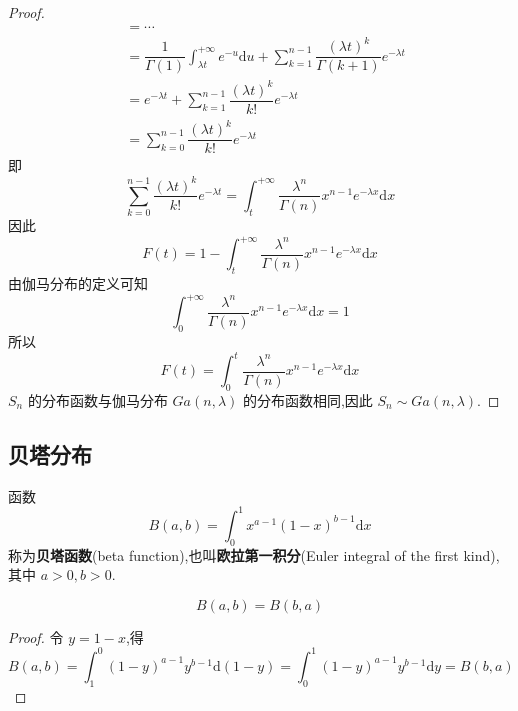 \begin{proof}
$$\begin{aligned}
        &= \cdots \\
        &= \dfrac{1}{\Gamma(1)} \int_{\lambda t}^{+\infty} e^{-u} \text{d}u + \sum_{k=1}^{n-1} \dfrac{(\lambda t)^{k}}{\Gamma(k+1)} e^{-\lambda t} \\
        &= e^{-\lambda t} + \sum_{k=1}^{n-1} \dfrac{(\lambda t)^{k}}{k!} e^{-\lambda t} \\
        &= \sum_{k=0}^{n-1} \dfrac{(\lambda t)^{k}}{k!} e^{-\lambda t}
    \end{aligned}
    $$
    即
    $$
    \sum_{k=0}^{n-1} \dfrac{(\lambda t)^{k}}{k!} e^{-\lambda t} = \int_{t}^{+\infty} \dfrac{\lambda^n}{\Gamma(n)} x^{n-1} e^{-\lambda x} \text{d}x
    $$
    因此
    $$
    F(t) = 1 - \int_{t}^{+\infty} \dfrac{\lambda^n}{\Gamma(n)} x^{n-1} e^{-\lambda x} \text{d}x
    $$
    由伽马分布的定义可知
    $$
    \int_{0}^{+\infty} \dfrac{\lambda^n}{\Gamma(n)} x^{n-1} e^{-\lambda x} \text{d}x = 1
    $$
    所以
    $$
    F(t) = \int_{0}^{t} \dfrac{\lambda^n}{\Gamma(n)} x^{n-1} e^{-\lambda x} \text{d}x
    $$
    $S_n$ 的分布函数与伽马分布 $Ga(n,\lambda)$ 的分布函数相同,因此 $S_n \sim Ga(n,\lambda)$.
\end{proof}

\subsection{贝塔分布}

\begin{definition}
    \indent 函数
    \begin{equation}
        B(a,b) = \int_{0}^{1} x^{a-1} (1-x)^{b-1} \mathrm{d}x
    \end{equation}
    称为\textbf{贝塔函数}(beta function),也叫\textbf{欧拉第一积分}(Euler integral of the first kind),其中 $a>0, b>0$.
\end{definition}

\begin{property}
    \begin{equation}
        B(a,b) = B(b,a)
    \end{equation}
\end{property}

\begin{proof}
    令 $y = 1-x$,得
    $$
    B(a,b) = \int_{1}^{0} (1-y)^{a-1} y^{b-1} \mathrm{d}(1-y) = \int_{0}^{1} (1-y)^{a-1} y^{b-1} \mathrm{d}y = B(b,a)
    $$

    \vspace{-1.8em}
\end{proof}

